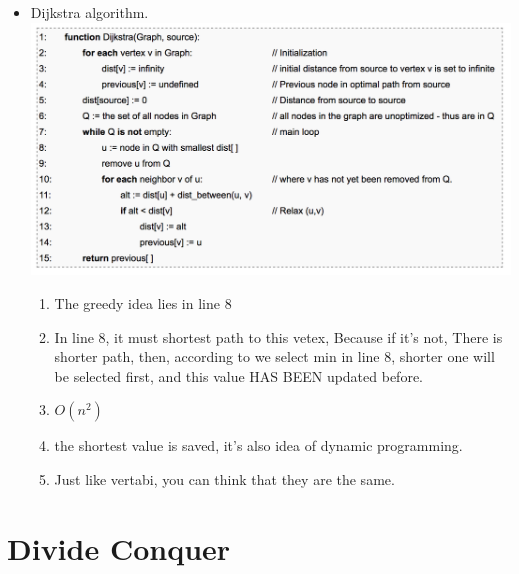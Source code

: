 \documentclass[a4paper,11pt,twoside]{book}
\begin{document}
\begin{itemize}
\item Dijkstra algorithm.  \newline
\includegraphics[scale=0.45]{pics/Dijkstra.png} \newline
\begin{enumerate}
\item The greedy idea lies in line 8
\item In line 8, it must shortest path to this vetex,  Because if it's not, There is shorter path, then, according to we select min in line 8, shorter one will be selected first, and this value HAS BEEN updated before. 
\item $O(n^{2})$
\item the shortest value is saved, it's also idea of dynamic programming.
\item Just like vertabi, you can think that they are the same. 
\end{enumerate}

\end{itemize}

\section{Divide Conquer}
\end{document}
